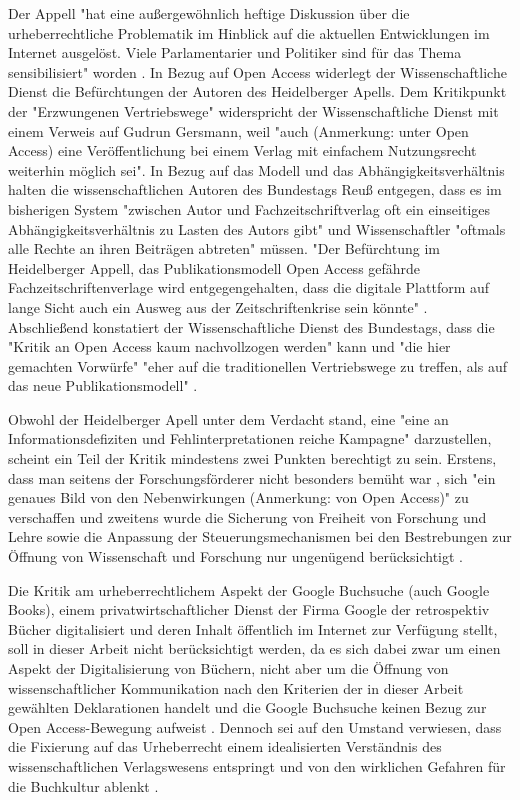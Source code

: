 Der Appell "hat eine außergewöhnlich heftige Diskussion über die urheberrechtliche Problematik im Hinblick auf die aktuellen Entwicklungen im Internet ausgelöst. Viele Parlamentarier und Politiker sind für das Thema sensibilisiert" worden \cite{WD_bundestag_2009}. In Bezug auf Open Access widerlegt der Wissenschaftliche Dienst die Befürchtungen der Autoren des Heidelberger Apells. Dem Kritikpunkt der "Erzwungenen Vertriebswege" widerspricht der Wissenschaftliche Dienst mit einem Verweis auf Gudrun Gersmann, weil "auch (Anmerkung: unter Open Access) eine Veröffentlichung bei einem Verlag mit einfachem Nutzungsrecht weiterhin möglich sei". In Bezug auf das Modell und das Abhängigkeitsverhältnis halten die wissenschaftlichen Autoren des Bundestags Reuß entgegen, dass es im bisherigen System "zwischen Autor und Fachzeitschriftverlag oft ein einseitiges Abhängigkeitsverhältnis zu Lasten des Autors gibt" und Wissenschaftler "oftmals alle Rechte an ihren Beiträgen abtreten" \cite{WD_bundestag_2009} müssen. "Der Befürchtung im Heidelberger Appell, das Publikationsmodell Open Access gefährde Fachzeitschriftenverlage wird entgegengehalten, dass die digitale Plattform auf lange Sicht auch ein Ausweg aus der Zeitschriftenkrise sein könnte" \cite{WD_bundestag_2009}. Abschließend konstatiert der Wissenschaftliche Dienst des Bundestags, dass die "Kritik an Open Access kaum nachvollzogen werden" kann und "die hier gemachten Vorwürfe" "eher auf die traditionellen Vertriebswege zu treffen, als auf das neue Publikationsmodell" \cite{WD_bundestag_2009}.

Obwohl der Heidelberger Apell unter dem Verdacht stand, eine "eine an Informationsdefiziten und Fehlinterpretationen reiche Kampagne" \cite{Schmidt_2009} darzustellen, scheint ein Teil der Kritik  mindestens zwei Punkten berechtigt zu sein. Erstens, dass man seitens der Forschungsförderer nicht besonders bemüht war \cite{suchen}, sich "ein genaues Bild von den Nebenwirkungen (Anmerkung: von Open Access)" \cite{Reuss_2009} zu verschaffen und zweitens wurde die Sicherung von Freiheit von Forschung und Lehre sowie die Anpassung der Steuerungsmechanismen bei den Bestrebungen zur Öffnung von Wissenschaft und Forschung nur ungenügend berücksichtigt \cite{hagner_2015_sache_buches}.

Die Kritik am urheberrechtlichem Aspekt der Google Buchsuche (auch Google Books), einem privatwirtschaftlicher Dienst der Firma Google der retrospektiv Bücher digitalisiert und deren Inhalt öffentlich im Internet zur Verfügung stellt, soll in dieser Arbeit nicht berücksichtigt werden, da es sich dabei zwar um einen Aspekt der Digitalisierung von Büchern, nicht aber um die Öffnung von wissenschaftlicher Kommunikation nach den Kriterien der in dieser Arbeit gewählten Deklarationen handelt und die Google Buchsuche keinen Bezug zur Open Access-Bewegung aufweist \cite{hagner_2015_sache_buches}. Dennoch sei auf den Umstand verwiesen, dass die Fixierung auf das Urheberrecht einem idealisierten Verständnis des wissenschaftlichen Verlagswesens entspringt und von den wirklichen Gefahren für die Buchkultur ablenkt \cite{Hirschi_2015_buch_oa}.

